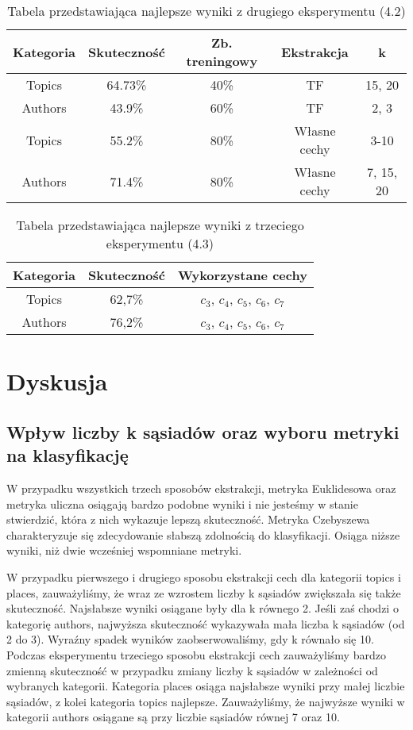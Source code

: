 \documentclass{classrep}
\begin{document}
\begin{table}[H]
	\centering
	\begin{tabular}{c c c c c} 
		\hline
		\textbf{Kategoria} & \textbf{Skuteczność} & \textbf{Zb. treningowy} & \textbf{Ekstrakcja} &  \textbf{k} \\ [0.5ex]
		\hline
		\hline 
		Topics & 64.73\% & 40\% & TF & 15, 20 \\
		Authors & 43.9\% & 60\% & TF & 2, 3 \\
		Topics & 55.2\% & 80\% & Własne cechy & 3-10 \\
		Authors & 71.4\% & 80\% & Własne cechy & 7, 15, 20 \\
		\hline
	\end{tabular}
	\caption{Tabela przedstawiająca najlepsze wyniki z drugiego eksperymentu (4.2)}
\end{table}

\begin{table}[H]
	\centering
	\begin{tabular}{c c c} 
		\hline
		\textbf{Kategoria} & \textbf{Skuteczność} & \textbf{Wykorzystane cechy} \\ [0.5ex]
		\hline
		\hline 
		Topics & 62,7\% & $c_{3}$, $c_{4}$, $c_{5}$, $c_{6}$, $c_{7}$ \\
		Authors & 76,2\% & $c_{3}$, $c_{4}$, $c_{5}$, $c_{6}$, $c_{7}$ \\
		\hline
	\end{tabular}
	\caption{Tabela przedstawiająca najlepsze wyniki z trzeciego eksperymentu (4.3)}
\end{table}

\section{Dyskusja}

\subsection{Wpływ liczby k sąsiadów oraz wyboru metryki na klasyfikację}
W przypadku wszystkich trzech sposobów ekstrakcji, metryka Euklidesowa oraz metryka uliczna osiągają bardzo podobne wyniki i nie jesteśmy w stanie stwierdzić, która z nich wykazuje lepszą skuteczność. Metryka Czebyszewa charakteryzuje się zdecydowanie słabszą zdolnością do klasyfikacji. Osiąga niższe wyniki, niż dwie wcześniej wspomniane metryki.
 \newline

W przypadku pierwszego i drugiego sposobu ekstrakcji cech dla kategorii topics i places, zauważyliśmy, że wraz ze wzrostem liczby k sąsiadów zwiększała się także skuteczność. Najsłabsze wyniki osiągane były dla k równego 2. Jeśli zaś chodzi o kategorię authors, najwyższa skuteczność wykazywała mała liczba k sąsiadów (od 2 do 3). Wyraźny spadek wyników zaobserwowaliśmy, gdy k równało się 10. Podczas eksperymentu trzeciego sposobu ekstrakcji cech zauważyliśmy bardzo zmienną skuteczność w przypadku zmiany liczby k sąsiadów w zależności od wybranych kategorii. Kategoria places osiąga najsłabsze wyniki przy małej liczbie sąsiadów, z kolei kategoria topics najlepsze. Zauważyliśmy, że najwyższe wyniki w kategorii authors osiągane są przy liczbie sąsiadów równej 7 oraz 10. 
\end{document}
